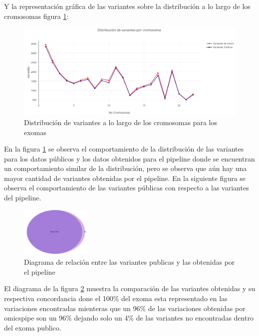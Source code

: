 Y la representación gráfica de las variantes sobre la distribución a lo largo de los cromosomas figura \ref{fig:variaciones2}:

\begin{figure}[H]
	\centering
	\includegraphics[width=1\textwidth]{Kap2/variaciones2}
	\caption{Distribución de variantes a lo largo de los cromosomas para los exomas} \label{fig:variaciones2}
\end{figure}

En la figura \ref{fig:variaciones2} se observa el comportamiento de la distribución de las variantes para los datos públicos y los datos obtenidos para el pipeline donde se encuentran un comportamiento similar de la distribución, pero se observa que aún hay una mayor cantidad de variantes obtenidas por el pipeline. En la siguiente figura se observa el comportamiento de las variantes públicas con respecto a las variantes del pipeline. 

\begin{figure}[H]
	\centering
	\includegraphics[width=0.3\textwidth]{Kap2/diagrama2}
	\caption{Diagrama de relación entre las variantes publicas y las obtenidas por el pipeline} \label{fig:diagrama2}
\end{figure}

El diagrama de la figura \ref{fig:diagrama2} muestra la comparación de las variantes obtenidas y su respectiva concordancia done el 100\% del exoma esta representado en las variaciones encontradas mienteras que un 96\% de las variaciones obtenidas por omicspipe son un 96\% dejando solo un 4\% de las variantes no encontradas dentro del exoma publico. \\

